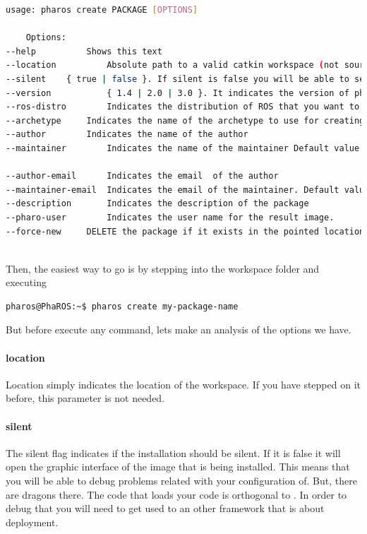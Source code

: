 \documentclass[a4paper,10pt,twoside]{book}
\begin{document}
				\begin{lstlisting}[language=bash,title={ Package creation help }]
	usage: pharos create PACKAGE [OPTIONS]
 
	Options:
--help			Shows this text
--location			Absolute path to a valid catkin workspace (not source folder. The workspace. By example /home/user/workspace ). Default value is the current directory.		
--silent	{ true | false }. If silent is false you will be able to see the installation of the output image. Default value is true. 
--version			{ 1.4 | 2.0 | 3.0 }. It indicates the version of pharo to download. It will not count if you are in a not silent session.  Default value is 2.0
--ros-distro		Indicates the distribution of ROS that you want to use. By default is groovy { groovy | hydro | fuerte } 	
--archetype		Indicates the name of the archetype to use for creating things. Default is basic-archetype.
--author		Indicates the name of the author
--maintainer		Indicates the name of the maintainer Default value is the indicated in author

--author-email		Indicates the email  of the author
--maintainer-email	Indicates the email of the maintainer. Default value is the indicated in author-email
--description		Indicates the description of the package
--pharo-user		Indicates the user name for the result image.
--force-new		DELETE the package if it exists in the pointed location. 
	
				\end{lstlisting} 


				Then, the easiest way to go is by stepping into the workspace folder and executing 

				\begin{lstlisting}[language=bash,title={ Package creation }]
					pharos@PhaROS:~$ pharos create my-package-name
				\end{lstlisting}
				
				But before execute any command, lets make an analysis of the options we have.
				
				
				\paragraph{location}
					Location simply indicates the location of the workspace. If you have stepped on it before, this parameter is not needed. 
					
				\paragraph{silent}
					The silent flag indicates if the installation should be silent. If it is false it will open the graphic interface of the image that is being installed. This means that you will be able to debug problems related with your configuration of. But, there are dragons there. The code that loads your code is orthogonal to \fwkName{}. In order to debug that you will need to get used to an other framework that is about deployment.
				
\end{document}
